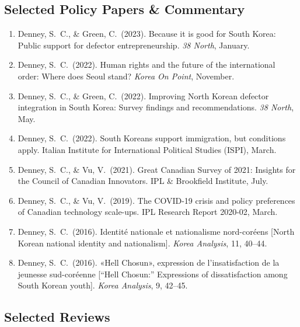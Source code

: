 \documentclass[11pt, a4paper]{article}
\begin{document}
\subsection{Selected Policy Papers \& Commentary}

\begin{enumerate}[itemsep=0.15em]
  \item Denney, S.\ C., \& Green, C.\ (2023). Because it is good for South Korea: Public support for defector entrepreneurship. \textit{38 North}, January.

  \item Denney, S.\ C.\ (2022). Human rights and the future of the international order: Where does Seoul stand? \textit{Korea On Point}, November.

  \item Denney, S.\ C., \& Green, C.\ (2022). Improving North Korean defector integration in South Korea: Survey findings and recommendations. \textit{38 North}, May.

  \item Denney, S.\ C.\ (2022). South Koreans support immigration, but conditions apply. Italian Institute for International Political Studies (ISPI), March.

  \item Denney, S.\ C., \& Vu, V.\ (2021). Great Canadian Survey of 2021: Insights for the Council of Canadian Innovators. IPL \& Brookfield Institute, July.

  \item Denney, S.\ C., \& Vu, V.\ (2019). The COVID-19 crisis and policy preferences of Canadian technology scale-ups. IPL Research Report 2020-02, March.

  \item Denney, S.\ C.\ (2016). Identité nationale et nationalisme nord-coréens [North Korean national identity and nationalism]. \textit{Korea Analysis}, 11, 40--44.

  \item Denney, S.\ C.\ (2016). «Hell Chosun», expression de l'insatisfaction de la jeunesse sud-coréenne [``Hell Chosun:'' Expressions of dissatisfaction among South Korean youth]. \textit{Korea Analysis}, 9, 42--45.
\end{enumerate}

\subsection{Selected Reviews}
\end{document}
